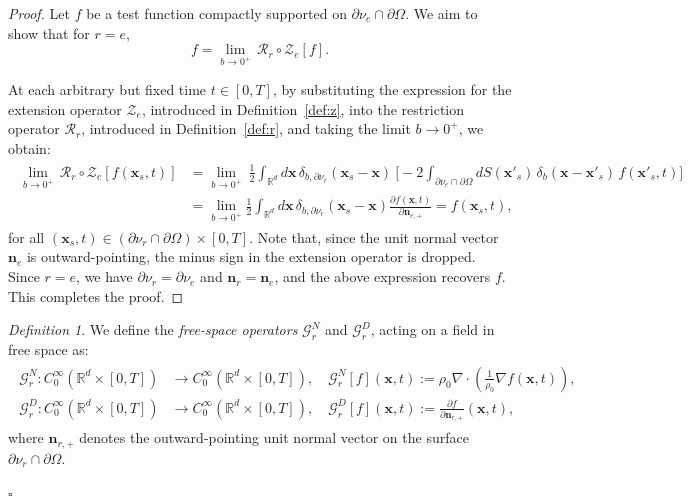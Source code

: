 \documentclass[11pt,reqno]{amsart}
\theoremstyle{remark}
\newtheorem{definition}{Definition}
\theoremstyle{italic_lemma}
\newcommand{\bx}{\boldsymbol{x}}
\newcommand{\bn}{\boldsymbol{n}}
\begin{document}
\begin{proof}
Let \( f \) be a test function compactly supported on \( \partial \nu_e \cap \partial \Omega \). We aim to show that for \( r = e \),
\[
f =  \lim_{b \to 0^+} \,  \mathcal{R}_r \circ \mathcal{Z}_e \left[ f \right].
\]

\noindent
At each arbitrary but fixed time \( t \in [0,T]\), by substituting the expression for the extension operator \( \mathcal{Z}_e \), introduced in Definition~\eqref{def:z}, into the restriction operator \( \mathcal{R}_r \), introduced in Definition~\eqref{def:r}, and taking the limit \( b \to 0^+ \), we obtain:
\begin{align*}
\begin{split}
   \lim_{b \to 0^+}  \,  \mathcal{R}_r \circ \mathcal{Z}_e \left[ f(\bx_s, t) \right]  
    & =   \lim_{b \to 0^+} \ \frac{1}{2} \int_{\mathbb{R}^d} d\bx \,  \delta_{b,\partial \nu_r}(\bx_s - \bx)
   \ \Big[ -2 \int_{\partial \nu_e \cap \partial \Omega} dS(\bx'_s) \, \delta_b(\bx - \bx'_s) \, f(\bx'_s, t) \Big] \\
    & =  \lim_{b \to 0^+} \frac{1}{2}  \int_{\mathbb{R}^d} d\bx \,  \delta_{b,\partial \nu_r}(\bx_s - \bx)  \frac{\partial f(\bx, t)}{\partial \bn_{e,+}}  =   f(\bx_s, t),
 \end{split}
\end{align*}
for all \((\bx_s, t) \in (\partial \nu_r \cap \partial \Omega) \times [0, T]\). 
Note that, since the unit normal vector \(\bn_e\) is outward-pointing, the minus 
sign in the extension operator is dropped. Since \( r = e \), we have \( \partial \nu_r = \partial \nu_e \) and \(\bn_r = \bn_e \), and the above expression recovers \( f \). This completes the proof.

\end{proof}



\begin{definition}   \label{def:rff}
We define the \emph{free-space operators} \( \mathcal{G}_r^N \) and \( \mathcal{G}_r^D \), acting on a field in free space as:
\begin{align}  \label{eq:fdn}
    \begin{split}
        \mathcal{G}_r^N : C_0^{\infty}\left( \mathbb{R}^d \times [0,T] \right) &\rightarrow C_0^{\infty}\left( \mathbb{R}^d \times [0,T] \right), \quad \mathcal{G}_r^N[f](\bx, t) := \rho_0 \nabla \cdot \left( \frac{1}{\rho_0} \nabla f (\bx, t) \right), \\
        \mathcal{G}_r^D : C_0^{\infty}\left( \mathbb{R}^d \times [0,T] \right) &\rightarrow C_0^{\infty}\left( \mathbb{R}^d \times [0,T] \right), \quad \mathcal{G}_r^D[f](\bx, t) := \frac{\partial f}{\partial \bn_{r,+}}(\bx, t),
    \end{split}
\end{align}
where \( \bn_{r,+} \) denotes the outward-pointing unit normal vector on the surface \( \partial \nu_r \cap \partial \Omega \).

\end{definition}
\hfill\(\square\)
\end{document}
